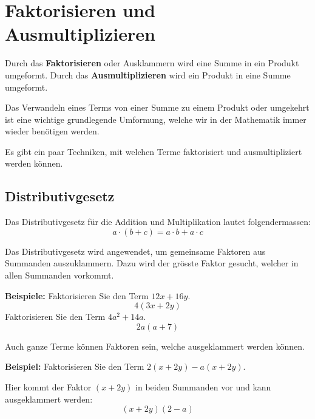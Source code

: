 \newpage
\section{Faktorisieren und Ausmultiplizieren}
Durch das \textbf{Faktorisieren} oder Ausklammern wird eine Summe in ein Produkt umgeformt. Durch das \textbf{Ausmultiplizieren} wird ein Produkt in eine Summe umgeformt.

\begin{center}
\end{center}

Das Verwandeln eines Terms von einer Summe zu einem Produkt oder umgekehrt ist eine wichtige grundlegende Umformung, welche wir in der Mathematik immer wieder benötigen werden.

Es gibt ein paar Techniken, mit welchen Terme faktorisiert und ausmultipliziert werden können.

\subsection{Distributivgesetz}

Das Distributivgesetz für die Addition und Multiplikation lautet folgendermassen:
\[
  a\cdot(b+c) = a\cdot b + a\cdot c
\]

Das Distributivgesetz wird angewendet, um gemeinsame Faktoren aus Summanden auszuklammern. Dazu wird der grösste Faktor gesucht, welcher in allen Summanden vorkommt.

\begin{example}
  \textbf{Beispiele:} Faktorisieren Sie den Term $12x+16y$.
  \[
    4(3x+2y)
  \]
  Faktorisieren Sie den Term $4a^{2}+14a$.
  \[
    2a(a+7)
  \]
\end{example}

Auch ganze Terme können Faktoren sein, welche ausgeklammert werden können.

\begin{example}
  \textbf{Beispiel:} Faktorisieren Sie den Term $2(x+2y)-a(x+2y)$.

  Hier kommt der Faktor $(x+2y)$ in beiden Summanden vor und kann ausgeklammert werden:
  \[
    (x+2y)(2-a)
  \]
\end{example}

